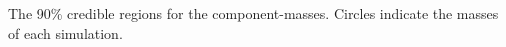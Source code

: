 \label{fig:comp-masses} The 90\% credible regions for the component-masses.  Circles indicate the masses of each simulation.